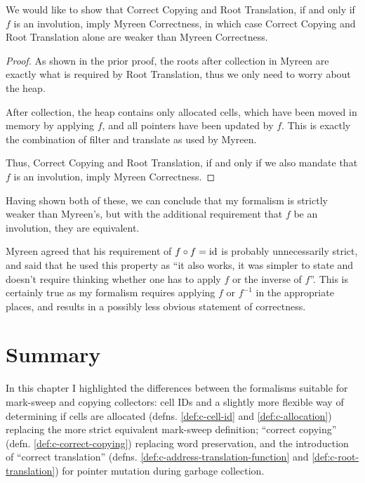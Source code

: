 \begin{theorem}
  We would like to show that Correct Copying and Root Translation, if
  and only if $f$ is an involution, imply Myreen Correctness, in which
  case Correct Copying and Root Translation alone are weaker than
  Myreen Correctness.

  \begin{proof}
    As shown in the prior proof, the roots after collection in Myreen
    are exactly what is required by Root Translation, thus we only
    need to worry about the heap.

    After collection, the heap contains only allocated cells, which
    have been moved in memory by applying $f$, and all pointers have
    been updated by $f$. This is exactly the combination of filter and
    translate as used by Myreen.

    Thus, Correct Copying and Root Translation, if and only if we also
    mandate that $f$ is an involution, imply Myreen Correctness.
  \end{proof}
\end{theorem}

Having shown both of these, we can conclude that my formalism is
strictly weaker than Myreen's, but with the additional requirement
that $f$ be an involution, they are equivalent.

Myreen\cite{MyreenEmail} agreed that his requirement of $f \circ f =
\mathrm{id}$ is probably unnecessarily strict, and said that he used this
property as ``it also works, it was simpler to state and doesn't
require thinking whether one has to apply $f$ or the inverse of
$f$''. This is certainly true as my formalism requires applying $f$ or
$f^{-1}$ in the appropriate places, and results in a possibly less
obvious statement of correctness.

\section{Summary}
\label{sec:copying-summary}

In this chapter I highlighted the differences between the formalisms
suitable for \gls{mark-sweep} and \gls{copying} \glspl{collector}:
cell IDs and a slightly more flexible way of determining if cells are
allocated (defns. \ref{def:c-cell-id} and \ref{def:c-allocation})
replacing the more strict equivalent mark-sweep definition; ``correct
copying'' (defn. \ref{def:c-correct-copying}) replacing word
preservation, and the introduction of ``correct translation''
(defns. \ref{def:c-address-translation-function} and
\ref{def:c-root-translation}) for \gls{pointer} mutation during
\gls{garbage collection}.

